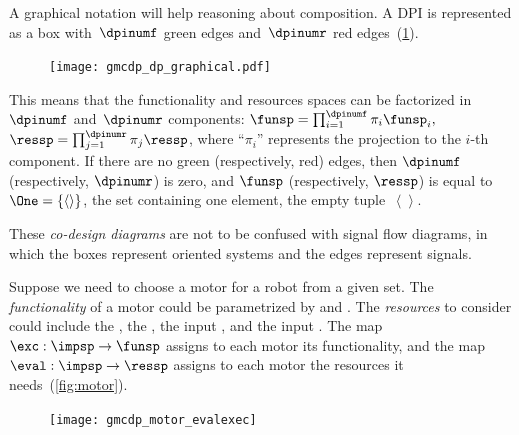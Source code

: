 A graphical notation will help reasoning about composition. A DPI is represented as a box with~$\dpinumf$ green edges and~$\dpinumr$ red edges~(\cref{fig:dp_graphical}).

\begin{figure}[h]
    \centering
    \texttt{[image: gmcdp\_dp\_graphical.pdf]}
    \caption{\label{fig:dp_graphical}}
\end{figure}

\noindent This means that the functionality and resources spaces
can be factorized in~$\dpinumf$ and~$\dpinumr$ components: $\funsp=\prod_{i=1}^{\dpinumf}\pi_{i}\funsp_{i},$
$\ressp=\prod_{j=1}^{\dpinumr}\pi_{j}\ressp$, where ``$\pi_{i}$''
represents the projection to the $i$-th component. If there are no
green (respectively, red) edges, then $\dpinumf$ (respectively, $\dpinumr$)
is zero, and $\funsp$ (respectively, $\ressp$) is equal to~$\One=\{\left\langle \right\rangle \}$,
the set containing one element, the empty tuple~$\left\langle \right\rangle $.

These \emph{co-design diagrams} are not to be confused with signal
flow diagrams, in which the boxes represent oriented systems and the
edges represent signals.


\begin{example}
\label{exa:motor}Suppose we need to choose a motor for a robot from
a given set. The \emph{functionality} of a motor could be parametrized
by  and . The \emph{resources} to consider
could include the , the , the
input , and the input .
The map~$\exc:\impsp\rightarrow\funsp$ assigns to each motor its
functionality, and the map~$\eval:\impsp\rightarrow\ressp$ assigns
to each motor the resources it needs~(\cref{fig:motor}).
\end{example}

\begin{figure}[h]
    \centering
\texttt{[image: gmcdp\_motor\_evalexec]}
    \caption{\label{fig:motor_evalexec}}
\end{figure}


